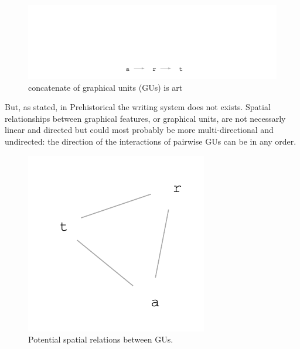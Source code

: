 \documentclass[article]{jss}\usepackage{knitr}
\begin{document}
\begin{figure}[H]

{\centering \includegraphics[width=\maxwidth]{figure/unnamed-chunk-1-1} 

}

\caption{\label{fig:figs}concatenate of graphical units (GUs) is art}\label{fig:unnamed-chunk-1}
\end{figure}



But, as stated, in Prehistorical the writing system does not exists. Spatial relationships between graphical features, or graphical units, are not necessarly linear and directed but could most probably be more multi-directional and undirected: the direction of the interactions of pairwise GUs can be in any order.

\begin{figure}[H]

{\centering \includegraphics[width=\maxwidth]{figure/unnamed-chunk-2-1} 

}

\caption{\label{fig:figs}Potential spatial relations between GUs.}\label{fig:unnamed-chunk-2}
\end{figure}
\end{document}
